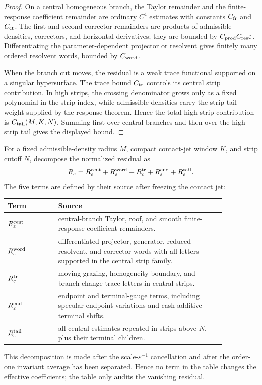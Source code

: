 \begin{proof}
On a central homogeneous branch, the Taylor remainder and the finite-response
coefficient remainder are ordinary \(C^4\) estimates with constants
\(C_{\rm fr}\) and \(C_{\rm ct}\).  The first and second corrector remainders
are products of admissible densities, correctors, and horizontal derivatives;
they are bounded by \(C_{\rm prod}C_{\rm res}\varepsilon\).  Differentiating
the parameter-dependent projector or resolvent gives finitely many ordered
resolvent words, bounded by \(C_{\rm word}\).

When the branch cut moves, the residual is a weak trace functional supported on
a singular hypersurface.  The trace bound \(C_{\rm tr}\) controls its central
strip contribution.  In high strips, the crossing denominator grows only as a
fixed polynomial in the strip index, while admissible densities carry the
strip-tail weight supplied by the response theorem.  Hence the total high-strip
contribution is \(C_{\rm tail}(M,K,N)\).  Summing first over central branches
and then over the high-strip tail gives the displayed bound.
\end{proof}

\begin{definition}
\label{def:supp_branch_residual_family}
For a fixed admissible-density radius \(M\), compact contact-jet window \(K\),
and strip cutoff \(N\), decompose the normalized residual as
\[
  R_\varepsilon
  =
  R_\varepsilon^{\rm cent}
  +R_\varepsilon^{\rm word}
  +R_\varepsilon^{\rm tr}
  +R_\varepsilon^{\rm end}
  +R_\varepsilon^{\rm tail}.
\]
The five terms are defined by their source after freezing the contact jet:
\begin{center}
\small
\begin{tabular}{p{0.2\linewidth}p{0.66\linewidth}}
\hline
Term & Source \\
\hline
\(R_\varepsilon^{\rm cent}\) &
central-branch Taylor, roof, and smooth finite-response coefficient
remainders. \\
\(R_\varepsilon^{\rm word}\) &
differentiated projector, generator, reduced-resolvent, and corrector words
with all letters supported in the central strip family. \\
\(R_\varepsilon^{\rm tr}\) &
moving grazing, homogeneity-boundary, and branch-change trace letters in
central strips. \\
\(R_\varepsilon^{\rm end}\) &
endpoint and terminal-gauge terms, including specular endpoint variations and
cash-additive terminal shifts. \\
\(R_\varepsilon^{\rm tail}\) &
all central estimates repeated in strips above \(N\), plus their terminal
children. \\
\hline
\end{tabular}
\end{center}
This decomposition is made after the scale-\(\varepsilon^{-1}\) cancellation
and after the order-one invariant average has been separated.  Hence no term
in the table changes the effective coefficients; the table only audits the
vanishing residual.
\end{definition}


